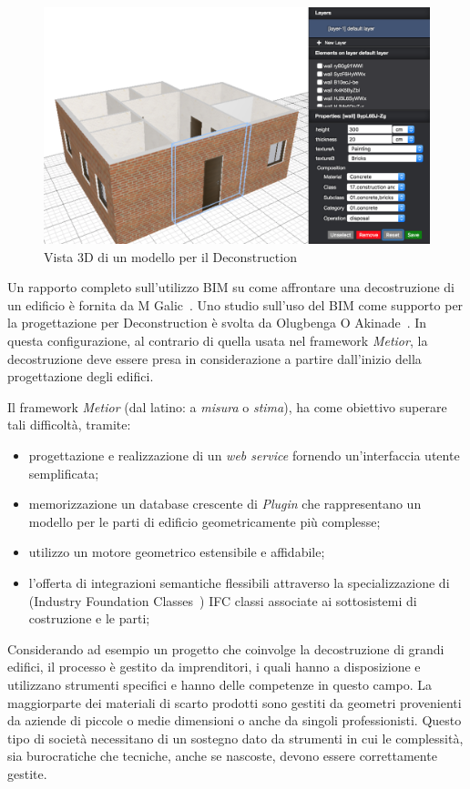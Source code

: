 \begin{figure}[htbp] %
   \centering
   \includegraphics[width=1\linewidth]{images/3d-sel}
   \caption{Vista 3D di un modello per il Deconstruction}
   \label{fig:augmented}
\end{figure}

Un rapporto completo sull'utilizzo BIM su come affrontare una decostruzione di un edificio è fornita da M Galic~\cite{galic2014bim}.
Uno studio sull'uso del BIM come supporto per la progettazione per Deconstruction è svolta da Olugbenga O Akinade~\cite{akinade2015waste}.
In questa configurazione, al contrario di quella usata nel framework \emph{Metior}, la decostruzione deve essere
presa in considerazione a partire dall'inizio della progettazione degli edifici.
\newpage


Il framework \emph{Metior} (dal latino: a \emph{misura} o \emph{stima}),
ha come obiettivo superare tali difficoltà, tramite:
\begin{itemize}
  \item progettazione e realizzazione di un \emph{web service} fornendo un'interfaccia utente semplificata;
  \item memorizzazione un database crescente di \emph{Plugin} che rappresentano un modello per le parti di edificio geometricamente più complesse;
  \item utilizzo un motore geometrico estensibile e affidabile;
  \item l'offerta di integrazioni semantiche flessibili attraverso la specializzazione di (Industry Foundation Classes~\cite{ifc})
        IFC classi associate ai sottosistemi di costruzione e le parti;
\end{itemize}

Considerando ad esempio un progetto che coinvolge la decostruzione di grandi edifici, il processo è
gestito da imprenditori, i quali hanno a disposizione e utilizzano strumenti specifici e hanno delle competenze in questo campo.
La maggiorparte dei materiali di scarto prodotti sono gestiti da geometri provenienti da aziende di piccole o medie dimensioni
o anche da singoli professionisti.
Questo tipo di società necessitano di un sostegno dato da strumenti in cui le complessità,
sia burocratiche che tecniche, anche se nascoste, devono essere correttamente gestite.\\
